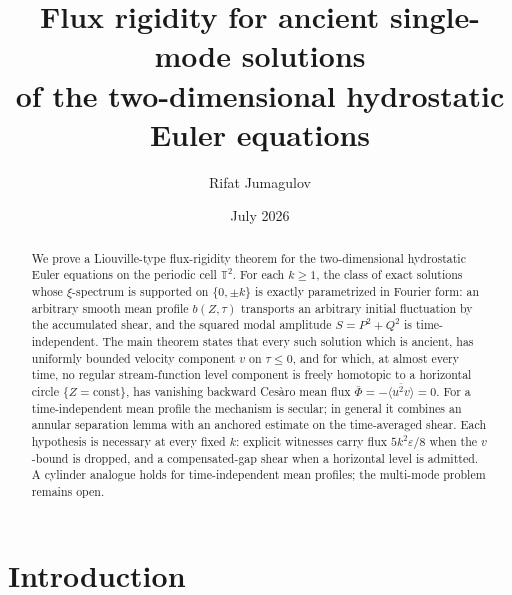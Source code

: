 \documentclass[11pt]{amsart}
\title[Flux rigidity for ancient single-mode hydrostatic Euler flows]{Flux
rigidity for ancient single-mode solutions\\ of the two-dimensional
hydrostatic Euler equations}
\author{Rifat Jumagulov}
\date{July 2026}
\theoremstyle{definition}
\theoremstyle{remark}
\newcommand{\T}{\mathbb{T}}
\newcommand{\Fbar}{\bar\Phi}
\newcommand{\mean}[1]{\langle #1\rangle}
\begin{document}
\begin{abstract}
We prove a Liouville-type flux-rigidity theorem for the two-dimensional
hydrostatic Euler equations on the periodic cell $\T^2$. For each $k\ge1$,
the class of exact solutions whose $\xi$-spectrum is supported on
$\{0,\pm k\}$ is exactly parametrized in Fourier form: an arbitrary smooth
mean profile $b(Z,\tau)$ transports an arbitrary initial fluctuation by
the accumulated shear, and the squared modal amplitude $S=P^2+Q^2$ is
time-independent. The main theorem states that every such solution which
is ancient, has uniformly bounded velocity component $v$ on
$\tau\le0$, and for which, at almost every time, no regular stream-function level
component is freely homotopic to a horizontal circle $\{Z=\mathrm{const}\}$, has
vanishing backward Ces\`aro mean flux
$\Fbar=-\overline{\mean{u^2v}}=0$. For a time-independent mean profile the
mechanism is secular; in general it combines an annular separation lemma
with an anchored estimate on the time-averaged shear. Each hypothesis is
necessary at every fixed $k$: explicit witnesses carry flux
$5k^2\varepsilon/8$ when the $v$-bound is dropped, and a
compensated-gap shear when a horizontal level is admitted. A cylinder analogue holds for time-independent mean
profiles; the multi-mode problem remains open.
\end{abstract}

\maketitle

\section{Introduction}\label{sec:intro}
\end{document}
